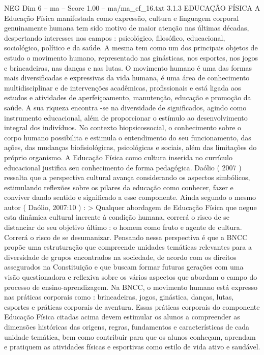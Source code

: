 \begin{textsample}{NEG Dim 6 – ma – Score 1.00 – ma/ma\_ef\_16.txt}  \label{ex:f6_neg_193}
3.1.3 EDUCAÇÃO FÍSICA A Educação Física manifestada como expressão, cultura e linguagem corporal genuinamente humana tem sido motivo de maior atenção nas últimas décadas, despertando interesses nos campos : psicológico, filosófico, educacional, sociológico, político e da saúde.
A mesma tem como um dos principais objetos de estudo o movimento humano, representado nas ginásticas, nos esportes, nos jogos e brincadeiras, nas danças e nas lutas.
O movimento humano é uma das formas mais diversificadas e expressivas da vida humana, é uma área de conhecimento multidisciplinar e de intervenções acadêmicas, profissionais e está ligada aos estudos e atividades de aperfeiçoamento, manutenção, educação e promoção da saúde.
A sua riqueza encontra -se na diversidade de significados, agindo como instrumento educacional, além de proporcionar o estímulo ao desenvolvimento integral dos indivíduos.
No contexto biopsicossocial, o conhecimento sobre o corpo humano possibilita e estimula o entendimento do seu funcionamento, das ações, das mudanças biofisiológicas, psicológicas e sociais, além das limitações do próprio organismo.
A Educação Física como cultura inserida no currículo educacional justifica seu conhecimento de forma pedagógica.
Daólio ( 2007 ) ressalta que a perspectiva cultural avança considerando os aspectos simbólicos, estimulando reflexões sobre os pilares da educação como conhecer, fazer e conviver dando sentido e significado a esse componente.
Ainda segundo o mesmo autor ( Daólio, 2007:10 ) : > Qualquer abordagem de Educação Física que negue esta dinâmica cultural inerente à condição humana, correrá o risco de se distanciar do seu objetivo último : o homem como fruto e agente de cultura.
Correrá o risco de se desumanizar.
Pensando nessa perspectiva é que a BNCC propõe uma estruturação que compreende unidades temáticas relevantes para a diversidade de grupos encontrados na sociedade, de acordo com os direitos assegurados na Constituição e que buscam formar futuras gerações com uma visão questionadora e reflexiva sobre os vários aspectos que abordam o campo do processo de ensino-aprendizagem.
Na BNCC, o movimento humano está expresso nas práticas corporais como : brincadeiras, jogos, ginástica, danças, lutas, esportes e práticas corporais de aventura.
Essas práticas corporais do componente Educação Física citadas acima devem estimular os alunos a compreender as dimensões históricas das origens, regras, fundamentos e características de cada unidade temática, bem como contribuir para que os alunos conheçam, aprendam e pratiquem as atividades físicas e esportivas como estilo de vida ativo e saudável.

\end{textsample}
